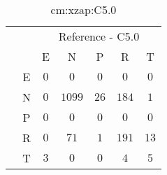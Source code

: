 \begin{table}[!ht]
	\centering
	\begin{tabular}{|c|c|c|c|c|c|c|}
		\cline{3-7}
		\multicolumn{2}{c|}{} & \multicolumn{5}{|c|}{Reference - C5.0} \\ \cline{3-7}
		\multicolumn{2}{c|}{} & E & N & P & R & T \\ \hline
		\multirow{5}{*}{\rotatebox{90}{Prediction}} & E & $0$ & $0$ & $0$ & $0$ & $0$ \\ \cline{2-7}
		 & N & $0$ & $1099$ & $26$ & $184$ & $1$ \\ \cline{2-7}
		 & P & $0$ & $0$ & $0$ & $0$ & $0$ \\ \cline{2-7}
		 & R & $0$ & $71$ & $1$ & $191$ & $13$ \\ \cline{2-7}
		 & T & $3$ & $0$ & $0$ & $4$ & $5$ \\ \hline
	\end{tabular}
	\caption{cm:xzap:C5.0}
	\label{tab:cm:xzap:C5.0}
\end{table}
